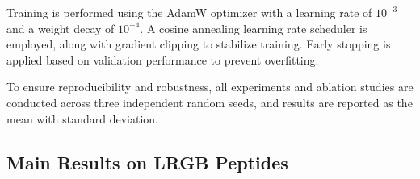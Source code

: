 \documentclass[10pt]{article}
\begin{document}
Training is performed using the AdamW optimizer \citep{loshchilov2017decoupled} with a learning rate of $10^{-3}$ and a weight decay of $10^{-4}$. A cosine annealing learning rate scheduler \citep{loshchilov2016sgdr} is employed, along with gradient clipping to stabilize training. Early stopping is applied based on validation performance to prevent overfitting.

To ensure reproducibility and robustness, all experiments and ablation studies are conducted across three independent random seeds, and results are reported as the mean with standard deviation.

\subsection{Main Results on LRGB Peptides}
\end{document}
